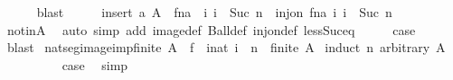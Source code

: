 \begin{isabellebody}
\ \ \ \ \isamarkupfalse%
\ blast\isanewline
\ \ \isamarkupfalse%
\ \isamarkupfalse%
\ {\isachardoublequoteopen}insert\ a\ A\ {\isacharequal}{\kern0pt}\ f{\isacharparenleft}{\kern0pt}n{\isacharcolon}{\kern0pt}{\isacharequal}{\kern0pt}a{\isacharparenright}{\kern0pt}\ {\isacharbackquote}{\kern0pt}\ {\isacharbraceleft}{\kern0pt}i{\isachardot}{\kern0pt}\ i\ {\isacharless}{\kern0pt}\ Suc\ n{\isacharbraceright}{\kern0pt}{\isachardoublequoteclose}\ \ {\isachardoublequoteopen}inj{\isacharunderscore}{\kern0pt}on\ {\isacharparenleft}{\kern0pt}f{\isacharparenleft}{\kern0pt}n{\isacharcolon}{\kern0pt}{\isacharequal}{\kern0pt}a{\isacharparenright}{\kern0pt}{\isacharparenright}{\kern0pt}\ {\isacharbraceleft}{\kern0pt}i{\isachardot}{\kern0pt}\ i\ {\isacharless}{\kern0pt}\ Suc\ n{\isacharbraceright}{\kern0pt}{\isachardoublequoteclose}\isanewline
\ \ \ \ \isamarkupfalse%
\ notinA\ \isamarkupfalse%
\ {\isacharparenleft}{\kern0pt}auto\ simp\ add{\isacharcolon}{\kern0pt}\ image{\isacharunderscore}{\kern0pt}def\ Ball{\isacharunderscore}{\kern0pt}def\ inj{\isacharunderscore}{\kern0pt}on{\isacharunderscore}{\kern0pt}def\ less{\isacharunderscore}{\kern0pt}Suc{\isacharunderscore}{\kern0pt}eq{\isacharparenright}{\kern0pt}\isanewline
\ \ \isamarkupfalse%
\ \isamarkupfalse%
\ {\isacharquery}{\kern0pt}case\ \isamarkupfalse%
\ blast\isanewline
{}\isamarkupfalse%
%
\endisatagproof
{\isafoldproof}%
%
\isadelimproof
\isanewline
%
\endisadelimproof
\isanewline
{}\isamarkupfalse%
\ nat{\isacharunderscore}{\kern0pt}seg{\isacharunderscore}{\kern0pt}image{\isacharunderscore}{\kern0pt}imp{\isacharunderscore}{\kern0pt}finite{\isacharcolon}{\kern0pt}\ {\isachardoublequoteopen}A\ {\isacharequal}{\kern0pt}\ f\ {\isacharbackquote}{\kern0pt}\ {\isacharbraceleft}{\kern0pt}i{\isacharcolon}{\kern0pt}{\isacharcolon}{\kern0pt}nat{\isachardot}{\kern0pt}\ i\ {\isacharless}{\kern0pt}\ n{\isacharbraceright}{\kern0pt}\ {\isasymLongrightarrow}\ finite\ A{\isachardoublequoteclose}\isanewline
%
\isadelimproof
%
\endisadelimproof
%
\isatagproof
{}\isamarkupfalse%
\ {\isacharparenleft}{\kern0pt}induct\ n\ arbitrary{\isacharcolon}{\kern0pt}\ A{\isacharparenright}{\kern0pt}\isanewline
\ \ \isamarkupfalse%
\ {}\isanewline
\ \ \isamarkupfalse%
\ \isamarkupfalse%
\ {\isacharquery}{\kern0pt}case\ \isamarkupfalse%
\ simp\isanewline
{}\isamarkupfalse%

\end{isabellebody}

